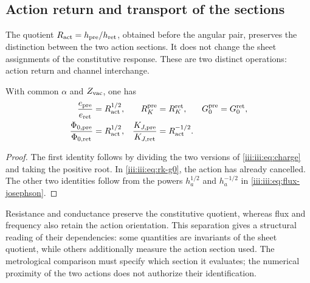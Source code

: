 \subsection{Action return and transport of the sections}

The quotient $R_{\rm act}=h_{\rm pre}/h_{\rm ret}$, obtained before the
angular pair, preserves the distinction between the two action sections.
It does not change the sheet assignments of the constitutive response. These are
two distinct operations: action return and channel interchange.

\begin{proposition}
With common $\alpha$ and $Z_{\rm vac}$, one has
\begin{align}
 \frac{e_{\rm pre}}{e_{\rm ret}}&=R_{\rm act}^{1/2},
 &R_K^{\rm pre}&=R_K^{\rm ret},
 &G_0^{\rm pre}&=G_0^{\rm ret},\label{iii:iii:eq:charge-return}\\
 \frac{\Phi_{0,\rm pre}}{\Phi_{0,\rm ret}}&=R_{\rm act}^{1/2},
 &\frac{K_{J,\rm pre}}{K_{J,\rm ret}}&=R_{\rm act}^{-1/2}.
 \label{iii:iii:eq:flux-return}
\end{align}
\end{proposition}
\begin{proof}
The first identity follows by dividing the two versions of
\eqref{iii:iii:eq:charge} and taking the positive root. In
\eqref{iii:iii:eq:rk-g0}, the action has already cancelled. The other two
identities follow from the powers $h_a^{1/2}$ and $h_a^{-1/2}$ in
\eqref{iii:iii:eq:flux-josephson}.
\end{proof}

Resistance and conductance preserve the constitutive quotient, whereas
flux and frequency also retain the action orientation. This
separation gives a structural reading of their dependencies: some quantities
are invariants of the sheet quotient, while others additionally measure the
action section used. The metrological comparison must specify which section it evaluates;
the numerical proximity of the two actions does not authorize their identification.
